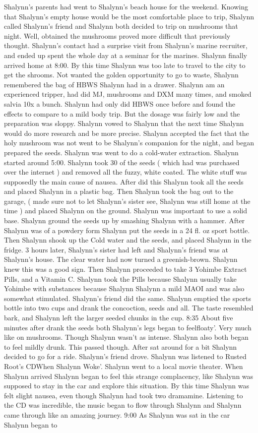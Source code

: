 \documentclass[12pt]{book}
\begin{document}
Shalynn's parents had went to Shalynn's beach house for the weekend. Knowing that Shalynn's empty house would be the most comfortable place to trip, Shalynn called Shalynn's friend and Shalynn both decided to trip on mushrooms that night. Well, obtained the mushrooms proved more difficult that previously thought. Shalynn's contact had a surprise visit from Shalynn's marine recruiter, and ended up spent the whole day at a seminar for the marines. Shalynn finally arrived home at 8:00. By this time Shalynn was too late to travel to the city to get the shrooms. Not wanted the golden opportunity to go to waste, Shalynn remembered the bag of HBWS Shalynn had in a drawer. Shalynn am an experienced tripper, had did MJ, mushrooms and DXM many times, and smoked salvia 10x a bunch. Shalynn had only did HBWS once before and found the effects to compare to a mild body trip. But the dosage was fairly low and the preparation was sloppy. Shalynn vowed to Shalynn that the next time Shalynn would do more research and be more precise. Shalynn accepted the fact that the holy mushroom was not went to be Shalynn's companion for the night, and began prepared the seeds. Shalynn was went to do a cold-water extraction. Shalynn started around 5:00. Shalynn took 30 of the seeds ( which had was purchased over the internet ) and removed all the fuzzy, white coated. The white stuff was supposedly the main cause of nausea. After did this Shalynn took all the seeds and placed Shalynn in a plastic bag. Then Shalynn took the bag out to the garage, ( made sure not to let Shalynn's sister see, Shalynn was still home at the time ) and placed Shalynn on the ground. Shalynn was important to use a solid base. Shalynn ground the seeds up by smashing Shalynn with a hammer. After Shalynn was of a powdery form Shalynn put the seeds in a 24 fl. oz sport bottle. Then Shalynn shook up the Cold water and the seeds, and placed Shalynn in the fridge. 3 hours later, Shalynn's sister had left and Shalynn's friend was at Shalynn's house. The clear water had now turned a greenish-brown. Shalynn knew this was a good sign. Then Shalynn proceeded to take 3 Yohimbe Extract Pills, and a Vitamin C. Shalynn took the Pills because Shalynn usually take Yohimbe with substances because Shalynn Shalynn a mild MAOI and was also somewhat stimulated. Shalynn's friend did the same. Shalynn emptied the sports bottle into two cups and drank the concoction, seeds and all. The taste resembled bark, and Shalynn left the larger seeded chunks in the cup. 8:35 About five minutes after drank the seeds both Shalynn's legs began to feelfloaty'. Very much like on mushrooms. Though Shalynn wasn't as intense. Shalynn also both began to feel mildly drunk. This passed though. After sat around for a bit Shalynn decided to go for a ride. Shalynn's friend drove. Shalynn was listened to Rusted Root's CDWhen Shalynn Woke'. Shalynn went to a local movie theater. When Shalynn arrived Shalynn began to feel this strange complacency, like Shalynn was supposed to stay in the car and explore this situation. By this time Shalynn was felt slight nausea, even though Shalynn had took two dramamine. Listening to the CD was incredible, the music began to flow through Shalynn and Shalynn came through like an amazing journey. 9:00 As Shalynn was sat in the car Shalynn began to 
\end{document}
